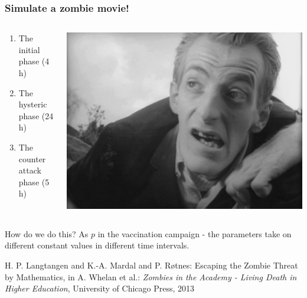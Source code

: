 \documentclass{beamer}
\newenvironment{block_mdfboxadmon}[1][]{\begin{block}{#1}}{\end{block}}
\begin{document}
\begin{frame}
\frametitle{Simulate a zombie movie!}

\begin{columns}
\begin{block_mdfboxadmon}
\begin{enumerate}
\item The initial phase (4 h)

\item The hysteric phase (24 h)

\item The counter attack phase (5 h)
\end{enumerate}

\noindent
\end{block_mdfboxadmon}



\begin{center}  %
  \centerline{\includegraphics[width=0.9\linewidth]{fig/TNotLD.pdf}}
\end{center}


\end{columns}






\pause
\begin{block}{}
How do we do this? As $p$ in the vaccination campaign - the parameters
take on different constant values in different time intervals.
\end{block}



\pause
\begin{block}{}
H. P. Langtangen and K.-A. Mardal and P. Røtnes:
Escaping the Zombie Threat by Mathematics, in
A. Whelan et al.: \emph{Zombies in the Academy - Living Death in Higher Education},
University of Chicago Press, 2013
\end{block}
\end{frame}
\end{document}
